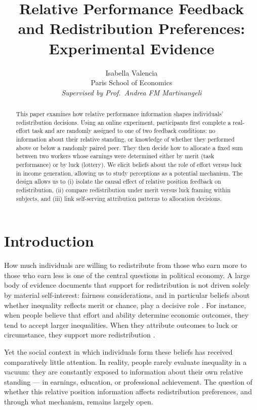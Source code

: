 \documentclass[12pt]{article}
\title{\textbf{Relative Performance Feedback and Redistribution Preferences: Experimental Evidence}}
\author{Isabella Valencia\\[6pt]
  \small Paris School of Economics\\[2pt]
  \small \textit{Supervised by Prof.\ Andrea FM Martinangeli}}
\date{}
\begin{document}
\maketitle

\begin{abstract}
This paper examines how relative performance information shapes individuals' redistribution decisions. Using an online experiment, participants first complete a real-effort task and are randomly assigned to one of two feedback conditions: no information about their relative standing, or knowledge of whether they performed above or below a randomly paired peer. They then decide how to allocate a fixed sum between two workers whose earnings were determined either by merit (task performance) or by luck (lottery). We elicit beliefs about the role of effort versus luck in income generation, allowing us to study perceptions as a potential mechanism. The design allows us to (i) isolate the causal effect of relative position feedback on redistribution, (ii) compare redistribution under merit versus luck framing within subjects, and (iii) link self-serving attribution patterns to allocation decisions.
\end{abstract}

\newpage

\section{Introduction}

How much individuals are willing to redistribute from those who earn more to those who earn less is one of the central questions in political economy. A large body of evidence documents that support for redistribution is not driven solely by material self-interest: fairness considerations, and in particular beliefs about whether inequality reflects merit or chance, play a decisive role \citep{alesina2005, fong2001, benabou2006}. For instance, when people believe that effort and ability determine economic outcomes, they tend to accept larger inequalities. When they attribute outcomes to luck or circumstance, they support more redistribution \citep{piketty1995, cappelen2007}.

Yet the social context in which individuals form these beliefs has received comparatively little attention. In reality, people rarely evaluate inequality in a vacuum: they are constantly exposed to information about their own relative standing — in earnings, education, or professional achievement. The question of whether this relative position information affects redistribution preferences, and through what mechanism, remains largely open.
\end{document}
